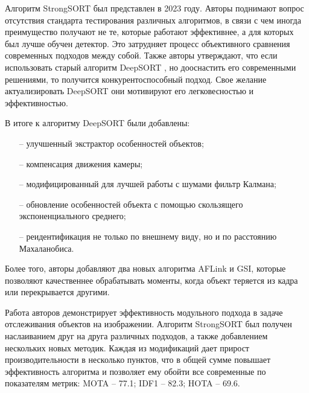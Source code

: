 Алгоритм StrongSORT \cite{du2023strongsort} был представлен в 2023 году. 
Авторы поднимают вопрос отсутствия стандарта тестирования различных алгоритмов, в связи с чем иногда преимущество получают не те, 
которые работают эффективнее, а для которых был лучше обучен детектор.
Это затрудняет процесс объективного сравнения современных подходов между собой. 
Также авторы утверждают, что если использовать старый алгоритм DeepSORT \cite{wojke2017deepsort}, но дооснастить его современными решениями, то получится конкурентоспособный подход. Свое желание актуализировать DeepSORT они мотивируют его легковесностью и эффективностью.

В итоге к алгоритму DeepSORT были добавлены:
\begin{itemize}
    \item[--] улучшенный экстрактор особенностей объектов;
    \item[--] компенсация движения камеры;
    \item[--] модифицированный для лучшей работы с шумами фильтр Калмана;
    \item[--] обновление особенностей объекта с помощью скользящего экспоненциального среднего;
    \item[--] реидентификация не только по внешнему виду, но и по расстоянию Махаланобиса.
\end{itemize}
Более того, авторы добавляют два новых алгоритма AFLink и GSI, которые позволяют качественнее обрабатывать моменты, когда объект теряется из кадра или перекрывается другими. 

Работа авторов демонстрирует эффективность модульного подхода в задаче отслеживания объектов на изображении. Алгоритм StrongSORT был получен наслаиванием друг на друга различных подходов, а также добавлением нескольких новых методик.
Каждая из модификаций дает прирост производительности в несколько пунктов, что в общей сумме повышает эффективность алгоритма и позволяет ему обойти все современные по показателям метрик: MOTA -- 77.1; IDF1 -- 82.3; HOTA -- 69.6.
